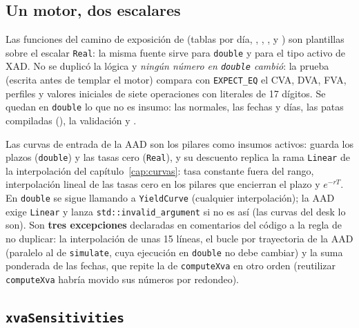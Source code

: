 \begin{sloppypar}
\subsection{Un motor, dos escalares}\label{sec:cap16-escalar}

Las funciones del camino de exposición de  (tablas por
día, , ,
,  y
) son plantillas sobre el escalar \texttt{Real}: la misma fuente sirve
para \texttt{double} y para el tipo activo de XAD. No se duplicó la lógica y \emph{ningún número en \texttt{double} cambió}:
la prueba  (escrita antes de templar el motor)
compara con \texttt{EXPECT\_EQ} el CVA, DVA, FVA, perfiles y valores iniciales de siete operaciones con literales de 17 dígitos. Se
quedan en \texttt{double} lo que no es insumo: las normales, las fechas y días, las patas compiladas
(), la validación y .

Las curvas de entrada de la AAD son los pilares como insumos activos:
 guarda los plazos (\texttt{double}) y las tasas cero (\texttt{Real}), y su
descuento replica la rama \texttt{Linear} de la interpolación del capítulo~\ref{cap:curvas}: tasa constante fuera del
rango, interpolación lineal de las tasas cero en los pilares que encierran el plazo y $e^{-rT}$. En \texttt{double} se
sigue llamando a \texttt{YieldCurve} (cualquier interpolación); la AAD exige \texttt{Linear} y
 lanza \texttt{std::invalid\_argument} si no es así (las curvas del desk lo
son). Son \textbf{tres excepciones} declaradas en comentarios del código a la regla de no duplicar:
la interpolación de unas 15 líneas, el bucle por trayectoria de la AAD (paralelo al de \texttt{simulate}, cuya
ejecución en \texttt{double} no debe cambiar) y la suma ponderada de las fechas, que repite la de \texttt{computeXva} en
otro orden (reutilizar \texttt{computeXva} habría movido sus números por redondeo).

\subsection{\texttt{xvaSensitivities}}\label{sec:cap16-xvasens}


\end{sloppypar}
